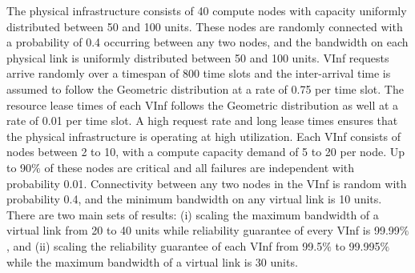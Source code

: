The physical infrastructure consists of 40 compute
nodes with capacity uniformly distributed between 50 and 100 units. These nodes are
randomly connected with a probability of 0.4 occurring between any two nodes, and the
bandwidth on each physical link is uniformly distributed between 50 and 100 units. VInf
requests arrive randomly over a timespan of 800 time slots and the inter-arrival time is
assumed to follow the Geometric distribution at a rate of 0.75 per time slot. The resource
lease times of each VInf follows the Geometric distribution as well at a rate of 0.01 per time
slot. A high request rate and long lease times ensures that the physical infrastructure is
operating at high utilization. Each VInf consists of nodes between 2 to 10, with a compute
capacity demand of 5 to 20 per node. Up to 90$\%$ of these nodes are critical and all failures
are independent with probability 0.01. Connectivity between any two nodes in the VInf is
random with probability 0.4, and the minimum bandwidth on any virtual link is 10 units.
There are two main sets of results: (i) scaling the maximum bandwidth of a virtual link
from 20 to 40 units while reliability guarantee of every VInf is 99.99$\%$, and (ii) scaling the
reliability guarantee of each VInf from 99.5$\%$ to 99.995$\%$ while the maximum bandwidth
of a virtual link is 30 units.

